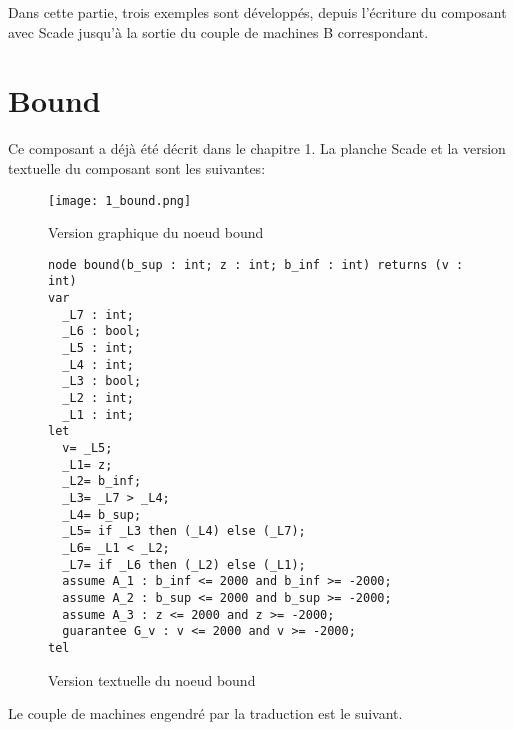 



Dans cette partie, trois exemples sont développés, depuis l'écriture du
composant avec Scade jusqu'à la sortie du couple de machines B correspondant.

\section{Bound}

Ce composant a déjà été décrit dans le chapitre 1. La planche Scade et la
version textuelle du composant sont les suivantes:

\begin{figure}[h]
\begin{center}
\texttt{[image: 1\_bound.png]}
\end{center}
\caption{Version graphique du noeud bound}
\end{figure}

\begin{figure}[h]
\begin{center}
\begin{footnotesize}
\begin{verbatim}
node bound(b_sup : int; z : int; b_inf : int) returns (v : int)
var
  _L7 : int;
  _L6 : bool;
  _L5 : int;
  _L4 : int;
  _L3 : bool;
  _L2 : int;
  _L1 : int;
let
  v= _L5;
  _L1= z;
  _L2= b_inf;
  _L3= _L7 > _L4;
  _L4= b_sup;
  _L5= if _L3 then (_L4) else (_L7);
  _L6= _L1 < _L2;
  _L7= if _L6 then (_L2) else (_L1);
  assume A_1 : b_inf <= 2000 and b_inf >= -2000;
  assume A_2 : b_sup <= 2000 and b_sup >= -2000;
  assume A_3 : z <= 2000 and z >= -2000;
  guarantee G_v : v <= 2000 and v >= -2000;
tel
\end{verbatim}
\end{footnotesize}
\end{center}
\caption{Version textuelle du noeud bound}
\end{figure}

\newpage

\noindent
Le couple de machines engendré par la traduction est le suivant.\\

